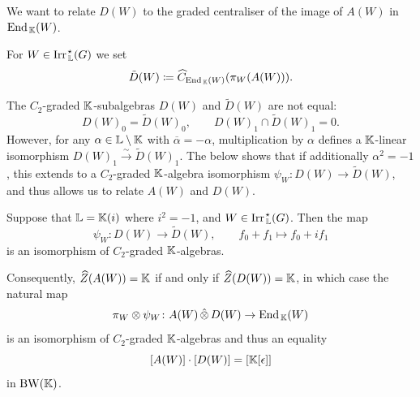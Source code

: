 We want to relate $D(W)$ to the graded centraliser of the image of $A(W)$ in $\operatorname{End}_{\, {\mathbb K}}(W)$. 

\begin{defn}
For $W \in \operatorname{Irr}_{\, {\mathbb L}}^{\hspace{0.1em} \star}(G)$ we set
\[
\tilde{D}(W) \coloneqq \widehat{C}_{\operatorname{End}_{\, {\mathbb K}}(W)}(\pi_W(A(W))).
\]
\end{defn}

The $C_2$-graded ${\mathbb K}$-subalgebras $D(W)$ and $\tilde{D}(W)$ are not equal:
\[
D(W)_0 = \tilde{D}(W)_0, \qquad D(W)_1 \cap \tilde{D}(W)_1 = 0.
\]
However, for any $\alpha \in {\mathbb L} \setminus {\mathbb K}$ with $\overline{\alpha} = - \alpha$, multiplication by $\alpha$ defines a ${\mathbb K}$-linear isomorphism $D(W)_1 \xrightarrow{\sim} \tilde{D}(W)_1$. The below shows that if additionally $\alpha^2 = -1$, this extends to a $C_2$-graded ${\mathbb K}$-algebra isomorphism $\psi_W \colon D(W) \rightarrow \tilde{D}(W)$, and thus allows us to relate $A(W)$ and $D(W)$.

\begin{prop}\label{prop:relateAWDW}
Suppose that ${\mathbb L} = {\mathbb K}(i)$ where $i^2 = -1$, and $W \in \operatorname{Irr}_{\, {\mathbb L}}^{\hspace{0.1em} \star}(G)$. Then the map
\[
   \psi_W \colon D(W) \rightarrow \tilde{D}(W), \qquad f_0 + f_1 \mapsto f_0 + if_1
\]
is an isomorphism of $C_2$-graded ${\mathbb K}$-algebras.

Consequently, $\widehat{Z}(A(W)) = {\mathbb K}$ if and only if $\widehat{Z}(D(W)) = {\mathbb K}$, in which case the natural map
\[
\pi_W \otimes \psi_W \colon A(W) \, \hat{\otimes} \, D(W) \rightarrow \operatorname{End}_{\, {\mathbb K}}(W)
\]
is an isomorphism of $C_2$-graded ${\mathbb K}$-algebras and thus an equality
\[
[A(W)] \cdot [D(W)] = [{\mathbb K}[\epsilon]]
\]
in $\operatorname{BW}({\mathbb K})$.
\end{prop}

